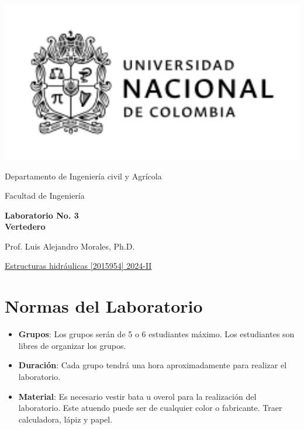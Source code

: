 \documentclass[10pt, a4paper]{exam}
\begin{document}
	\noindent
	\begin{minipage}[l]{0.1\textwidth}
		\noindent
		\includegraphics[width=2.8\textwidth]{ESCUDO.png}
	\end{minipage}
\hfill
\begin{minipage}[c]{0.8\textwidth}
	\begin{center}
		{\large  Departamento de Ingeniería civil y Agrícola\par
		\large	Facultad de Ingeniería	\par
    \large \textbf{Laboratorio No. 3\\Vertedero}	\par
} Prof. Luis Alejandro Morales, Ph.D.
	\end{center}
\end{minipage}
\par
\vspace{0.2in}
\noindent
    \uline{Estructuras hidráulicas [2015954]	\hfill 2024-II	}
\par 
\vspace{0.15in}
\noindent

\section{Normas del Laboratorio}
\begin{itemize}
    \item \textbf{Grupos}: Los grupos serán de 5 o 6 estudiantes máximo. Los estudiantes son libres de organizar los grupos.
    
    \item \textbf{Duración}: Cada grupo tendrá una hora aproximadamente para realizar el laboratorio.
    
    \item \textbf{Material}: Es necesario vestir bata u overol para la realización del laboratorio. Este atuendo puede ser de cualquier color o fabricante. Traer calculadora, lápiz y papel.
\end{itemize}
\end{document}
